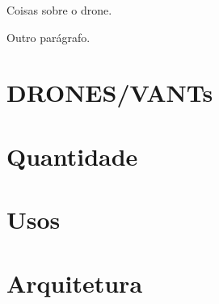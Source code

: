 
Coisas sobre o drone.

Outro parágrafo.

\section{DRONES/VANTs}
\section{Quantidade}
\section{Usos}
\section{Arquitetura}
